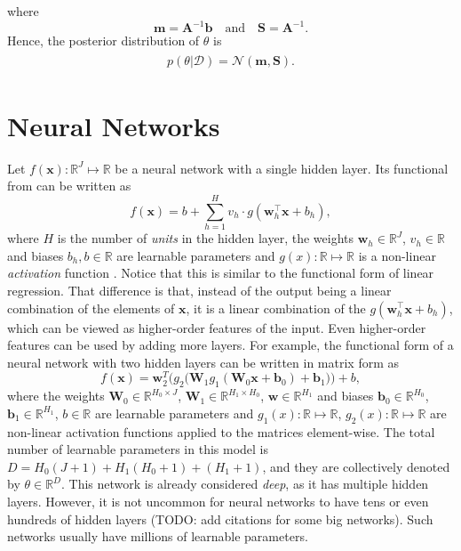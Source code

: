 \documentclass[msc,deptreport.inf]{infthesis} %
\newcommand{\matr}[1]{\mathbf{#1}}
\newcommand{\R}{\mathbb R}
\begin{document}
where
\begin{equation}\label{eqn:linear_regression_posterior_params}
	\matr{m} = \matr{A}^{-1} \matr{b}
	\quad \text{and} \quad 
	\matr{S} = \matr{A}^{-1}.
\end{equation}
Hence, the posterior distribution of $\theta$ is 
\begin{align}\label{eqn:linear_regression_posterior}
\begin{split}
	p(\theta | \mathcal{D}) = \mathcal{N}(\matr{m}, \matr{S}).
\end{split}
\end{align}


\section{Neural Networks}

Let $f(\matr{x}): \R^J \mapsto \R$ be a neural network with a single hidden layer. Its functional from can be written as
\begin{equation}
	f(\matr{x}) = b + \sum_{h=1}^H v_h \cdot g(\matr{w}_h^\intercal \matr{x} + b_h),
\end{equation} 
where $H$ is the number of \emph{units} in the hidden layer, the weights $\matr{w}_h \in \R^J$, $v_h \in \R$ and biases $b_h, b \in \R$ are learnable parameters and $g(x):\R \mapsto \R$ is a non-linear \emph{activation} function \cite{goodfellow2016}. Notice that this is similar to the functional form of linear regression. That difference is that, instead of the output being a linear combination of the elements of $\matr{x}$, it is a linear combination of the $g(\matr{w}_h^\intercal \matr{x} + b_h)$, which can be viewed as higher-order features of the input.  Even higher-order features can be used by adding more layers. For example, the functional form of a neural network with two hidden layers can be written in matrix form as
\begin{equation}
	f(\matr{x}) = \matr{w}_2^T \Big(g_2\big(\matr{W}_1 g_1(\matr{W}_0 \matr{x} + \matr{b}_0) + \matr{b}_1 \big) \Big) + b,
\end{equation} 
where the weights $\matr{W}_0 \in \R^{H_0 \times J}$, $\matr{W}_1 \in \R^{H_1 \times H_0}$, $\matr{w} \in \R^{H_1}$ and biases $\matr{b}_0 \in \R^{H_0}$, $\matr{b}_1 \in \R^{H_1}$, $b \in \R$ are learnable parameters and $g_1(x):\R \mapsto \R$, $g_2(x):\R \mapsto \R$ are non-linear activation functions applied to the matrices element-wise. The total number of learnable parameters in this model is $D=H_0(J + 1) + H_1(H_0 + 1) + (H_1 + 1)$, and they are collectively denoted by $\theta \in \R^D$. This network is already considered \emph{deep}, as it has multiple hidden layers. However, it is not uncommon for neural networks to have tens or even hundreds of hidden layers (TODO: add citations for some big networks). Such networks usually have millions of learnable parameters. 
\end{document}
